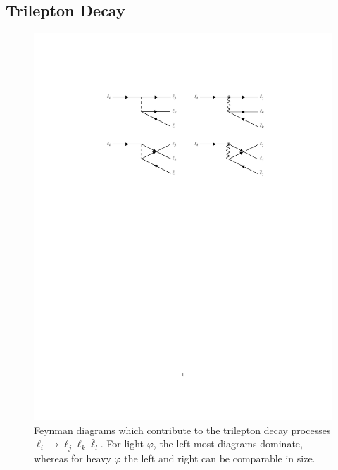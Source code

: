 {\subsection{Trilepton Decay}\label{sec:trilepton}

\begin{figure}[t!]
    \centering
    \includegraphics[width=0.8\linewidth]{figures/chapter3/trilepton_diagram.pdf}
    \caption[Feynman diagrams which contribute to the trilepton decay processes $\ell_i \rightarrow \ell_j \ell_k \bar{\ell}_l$. ]{Feynman diagrams which contribute to the trilepton decay processes $\ell_i \rightarrow \ell_j \ell_k \bar{\ell}_l$.  For light $\varphi$, the left-most diagrams dominate, whereas for heavy $\varphi$ the left and right can be comparable in size.}
    \label{fig:trilepton_vertex}
\end{figure}

}
